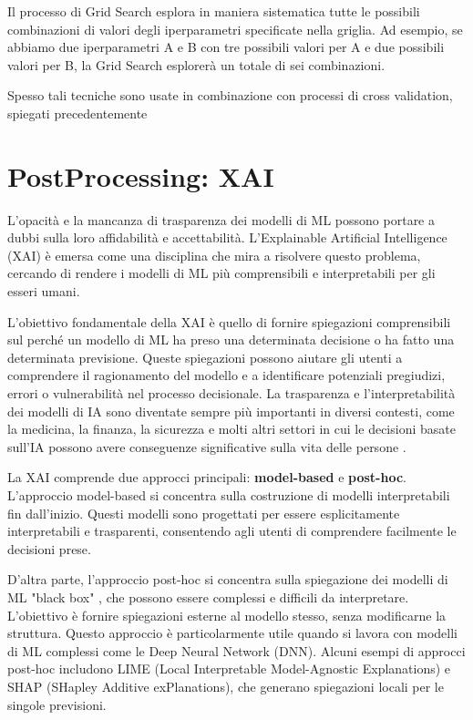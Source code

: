 \begin{flushleft}
\begin{itemize}
    Il processo di Grid Search esplora in maniera sistematica tutte le possibili combinazioni di valori degli iperparametri specificate nella griglia. Ad esempio, se abbiamo due iperparametri A e B con tre possibili valori per A e due possibili valori per B, la Grid Search esplorerà un totale di sei combinazioni.
\end{itemize}
Spesso tali tecniche sono usate in combinazione con processi di cross validation, spiegati precedentemente
\section{PostProcessing: XAI}
L'opacità e la mancanza di trasparenza dei  modelli di ML possono portare a dubbi sulla loro affidabilità e accettabilità. L'Explainable Artificial Intelligence (XAI) è emersa come una disciplina che mira a risolvere questo problema, cercando di rendere i modelli di ML più comprensibili e interpretabili per gli esseri umani.

L'obiettivo fondamentale della XAI è quello di fornire spiegazioni comprensibili sul perché un modello di ML ha preso una determinata decisione o ha fatto una determinata previsione. Queste spiegazioni possono aiutare gli utenti a comprendere il ragionamento del modello e a identificare potenziali pregiudizi, errori o vulnerabilità nel processo decisionale. La trasparenza e l'interpretabilità dei modelli di IA sono diventate sempre più importanti in diversi contesti, come la medicina, la finanza, la sicurezza e molti altri settori in cui le decisioni basate sull'IA possono avere conseguenze significative sulla vita delle persone \cite{aicambiatutto}.


La XAI comprende due approcci principali: \textbf{model-based} e \textbf{post-hoc}.
L'approccio model-based si concentra sulla costruzione di modelli interpretabili fin dall'inizio. Questi modelli sono progettati per essere esplicitamente interpretabili e trasparenti, consentendo agli utenti di comprendere facilmente le decisioni prese.

D'altra parte, l'approccio post-hoc si concentra sulla spiegazione dei modelli di ML "black box" , che possono essere complessi e difficili da interpretare. L'obiettivo è fornire spiegazioni esterne al modello stesso, senza modificarne la struttura. Questo approccio è particolarmente utile quando si lavora con modelli di ML complessi come le Deep Neural Network (DNN). Alcuni esempi di approcci post-hoc includono LIME (Local Interpretable Model-Agnostic Explanations) e SHAP (SHapley Additive exPlanations), che generano spiegazioni locali per le singole previsioni.


\end{flushleft}
